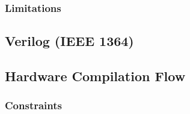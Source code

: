 \subsubsection{Limitations}
\label{vhdl:limitations}

\subsection{Verilog (IEEE 1364)}
\label{verilog}

\subsection{Hardware Compilation Flow}
\label{hardwareCompilationFlow}

\subsubsection{Constraints}
\label{hardwareCompilationFlow:constraints}
